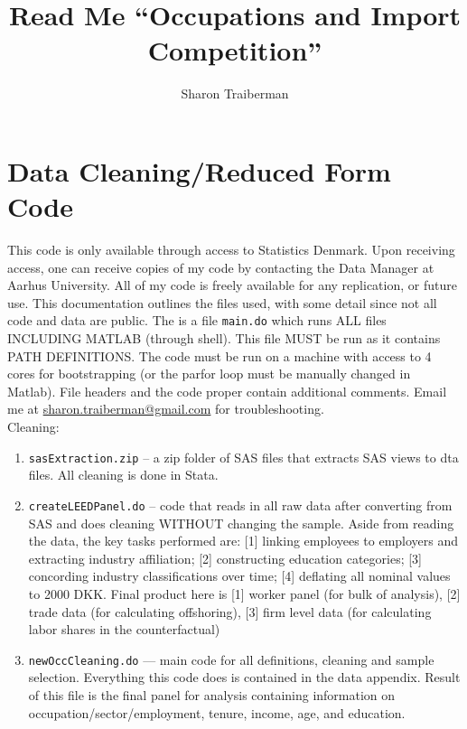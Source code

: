 \documentclass[11pt]{article}
\begin{document}
\title{Read Me ``Occupations and Import Competition''}


\author{Sharon Traiberman}

\maketitle

\section*{Data Cleaning/Reduced Form Code}
This code is only available through access to Statistics Denmark. Upon receiving access, one can receive copies of my code by contacting the Data Manager at Aarhus University. All of my code is freely available for any replication, or future use. This documentation outlines the files used, with some detail since not all code and data are public. The is a file \verb!main.do! which runs ALL files INCLUDING MATLAB (through shell). This file MUST be run as it contains PATH DEFINITIONS. The code must be run on a machine with access to 4 cores for bootstrapping (or the parfor loop must be manually changed in Matlab). File headers and the code proper contain additional comments. Email me at \href{mailto:sharon.traiberman@gmail.com}{sharon.traiberman@gmail.com} for troubleshooting.\\

Cleaning:
\begin{enumerate}
	\item \verb!sasExtraction.zip! -- a zip folder of SAS files that extracts SAS views to dta files. All cleaning is done in Stata.
	\item \verb!createLEEDPanel.do! -- code that reads in all raw data after converting from SAS and does cleaning WITHOUT changing the sample. Aside from reading the data, the key tasks performed are: [1] linking employees to employers and extracting industry affiliation; [2] constructing education categories; [3] concording industry classifications over time; [4] deflating all nominal values to 2000 DKK. Final product here is [1] worker panel (for bulk of analysis), [2] trade data (for calculating offshoring), [3] firm level data (for calculating labor shares in the counterfactual)
	\item \verb!newOccCleaning.do! --- main code for all definitions, cleaning and sample selection. Everything this code does is contained in the data appendix. Result of this file is the final panel for analysis containing information on occupation/sector/employment, tenure, income, age, and education.
\end{enumerate}
\end{document}
